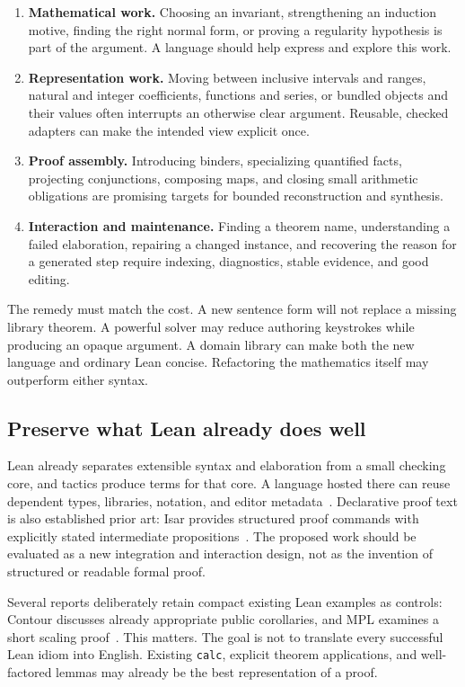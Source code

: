 \documentclass[11pt,letterpaper]{article}
\newcommand{\code}[1]{\nolinkurl{#1}}
\begin{document}
\begin{enumerate}
\item \textbf{Mathematical work.} Choosing an invariant, strengthening an induction
  motive, finding the right normal form, or proving a regularity hypothesis is
  part of the argument. A language should help express and explore this work.
\item \textbf{Representation work.} Moving between inclusive intervals and ranges,
  natural and integer coefficients, functions and series, or bundled objects and
  their values often interrupts an otherwise clear argument. Reusable, checked
  adapters can make the intended view explicit once.
\item \textbf{Proof assembly.} Introducing binders, specializing quantified facts,
  projecting conjunctions, composing maps, and closing small arithmetic obligations
  are promising targets for bounded reconstruction and synthesis.
\item \textbf{Interaction and maintenance.} Finding a theorem name, understanding a
  failed elaboration, repairing a changed instance, and recovering the reason for
  a generated step require indexing, diagnostics, stable evidence, and good editing.
\end{enumerate}

The remedy must match the cost. A new sentence form will not replace a missing
library theorem. A powerful solver may reduce authoring keystrokes while producing
an opaque argument. A domain library can make both the new language and ordinary
Lean concise. Refactoring the mathematics itself may outperform either syntax.

\subsection{Preserve what Lean already does well}
Lean already separates extensible syntax and elaboration from a small checking
core, and tactics produce terms for that core. A language hosted there can reuse
dependent types, libraries, notation, and editor metadata~\cite{lean-elab}.
Declarative proof text is also established prior art: Isar provides structured
proof commands with explicitly stated intermediate propositions~\cite{isar}.
The proposed work should be evaluated as a new integration and interaction design,
not as the invention of structured or readable formal proof.

Several reports deliberately retain compact existing Lean examples as controls:
Contour discusses already appropriate public corollaries, and MPL examines a
short scaling proof~\cite[\S2.5]{contour}\cite[\S9]{mpl}. This matters. The goal is
not to translate every successful Lean idiom into English. Existing \code{calc},
explicit theorem applications, and well-factored lemmas may already be the best
representation of a proof.
\end{document}
